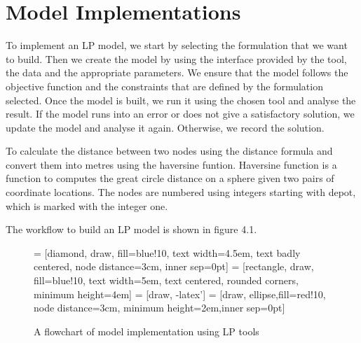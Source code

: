 \section{Model Implementations}
To implement an LP model, we start by selecting the formulation that we want to build. Then we create the model by using
the interface provided by the tool, the data and the appropriate parameters. We ensure that the model follows the objective function
 and the constraints that are defined by the formulation selected. Once the model is built, we run it
using the chosen tool and analyse the result. If the model runs into an error or does not give
a satisfactory solution, we update the model and analyse it again. Otherwise, we record the solution.

To calculate the distance between two nodes using the
distance formula and convert them into metres using the haversine funtion. Haversine function
is a function to computes the great circle distance on a sphere given two pairs of coordinate locations.
The nodes are numbered using integers starting with depot, which is marked with the integer one.

The workflow to build an LP model is shown in figure 4.1.

\vspace{0.5cm}
\begin{figure}[!ht]
     = [diamond, draw, fill=blue!10,
        text width=4.5em, text badly centered, node distance=3cm, inner sep=0pt]
     = [rectangle, draw, fill=blue!10,
        text width=5em, text centered, rounded corners, minimum height=4em]
     = [draw, -latex']
     = [draw, ellipse,fill=red!10, node distance=3cm,
        minimum height=2em,inner sep=0pt]
    \begin{center}
    \end{center}
    \caption{A flowchart of model implementation using LP tools}
\end{figure}


